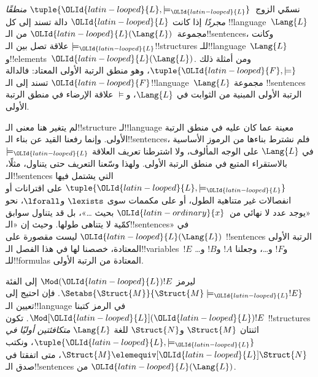 \documentclass[../../../include/open-logic-section]{subfiles}
\begin{document}

\begin{defn}
نسمّي الزوج~$\tuple{{\OLId{latin-looped}{L}},\models_{\OLId{latin-looped}{L}}}$ \emph{منطقًا مجردًا} إذا كانت ${\OLId{latin-looped}{L}}$ دالة تسند إلى
كل !!{language}~$\Lang{L}$ مجموعة~${\OLId{latin-looped}{L}}(\Lang{L})$ من الـ!!{sentence}s،
وكانت $\models_{\OLId{latin-looped}{L}}$ علاقة تصل بين الـ!!{structure}s للـ!!{language}~$\Lang{L}$
و!!{element}s~${\OLId{latin-looped}{L}}(\Lang{L})$. ومن أمثلة ذلك
$\tuple{{\OLId{latin-looped}{F}},\models}$، وهو منطق الرتبة الأولى المعتاد: فالدالة ${\OLId{latin-looped}{F}}$
تسند إلى الـ!!{language}~$\Lang{L}$ مجموعة !!{sentence}s الرتبة
الأولى المبنية من الثوابت في $\Lang{L}$، و$\models$ علاقة الإرضاء في
منطق الرتبة الأولى.
\end{defn}

لم يتغير هنا معنى الـ!!{structure} لـ!!{language}
معينة عما كان عليه في منطق الرتبة الأولى. وإنما رفعنا القيد عن بناء الـ!!{sentence}s،
فلم نشترط بناءها من الرموز الأساسية في $\Lang{L}$ على الوجه المألوف، ولا اشترطنا تعريف العلاقة
$\models_{\OLId{latin-looped}{L}}$ بالاستقراء المتبع في منطق الرتبة الأولى. ولهذا وسّعنا
التعريف حتى يتناول، مثلًا، الـ!!{sentence}s التي يشتمل فيها
$\tuple{{\OLId{latin-looped}{L}},\models_{\OLId{latin-looped}{L}}}$ على اقترانات أو انفصالات غير متناهية الطول، أو على مكممات
سوى $\lexists$ و$\lforall$، نحو «يوجد عدد لا نهائي من~${\OLId{latin-ordinary}{x}}$ بحيث
\dots»، بل قد يتناول سوابق كمّية لا يتناهى طولها. وحيث إن
«الـ!!{sentence}s» في ${\OLId{latin-looped}{L}}(\Lang{L})$ ليست مقصورة على !!{sentence}s
الرتبة الأولى المعتادة، خصصنا لها في هذا الفصل الـ!!{variable}s~$!E$
و$!F$ و\dots، وجعلنا $!A$ و$!B$ و\dots للـ!!{formula}s
المعتادة من الرتبة الأولى.

\begin{defn}
ليرمز $\Mod({\OLId{latin-looped}{L}}){!E}$ إلى الفئة
$\Setabs{\Struct{M}}{\Struct{M} \models_{\OLId{latin-looped}{L}} !E}$. فإن احتيج إلى تعيين
الـ!!{language} في الرمز كتبنا $\Mod[{\OLId{latin-looped}{L}}]({\OLId{latin-looped}{L}}){!E}$. تكون !!{structure}s اثنتان
$\Struct{M}$ و$\Struct{N}$ للغة $\Lang{L}$ \emph{متكافئتين أوليًا في}
$\tuple{{\OLId{latin-looped}{L}},\models_{\OLId{latin-looped}{L}}}$، ونكتب
$\Struct{M} \elemequiv[{\OLId{latin-looped}{L}}] \Struct{N}$، متى اتفقتا في صدق الـ!!{sentence}s
من ${\OLId{latin-looped}{L}}(\Lang{L})$.
\end{defn}
\end{document}
